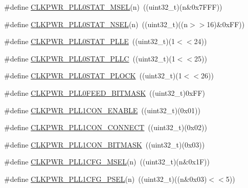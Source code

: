 \begin{DoxyCompactItemize}
\item 
\#define \hyperlink{group___c_l_k_p_w_r___private___macros_ga4e839399ffd20043dd46b1c0f37642fe}{\-C\-L\-K\-P\-W\-R\-\_\-\-P\-L\-L0\-S\-T\-A\-T\-\_\-\-M\-S\-E\-L}(n)~((uint32\-\_\-t)(n\&0x7\-F\-F\-F))
\item 
\#define \hyperlink{group___c_l_k_p_w_r___private___macros_ga33ba93a4bdf0992f4e942462f33abc3e}{\-C\-L\-K\-P\-W\-R\-\_\-\-P\-L\-L0\-S\-T\-A\-T\-\_\-\-N\-S\-E\-L}(n)~((uint32\-\_\-t)((n$>$$>$16)\&0x\-F\-F))
\item 
\#define \hyperlink{group___c_l_k_p_w_r___private___macros_gaa2ebc7980134442f9f9bc392e98ad463}{\-C\-L\-K\-P\-W\-R\-\_\-\-P\-L\-L0\-S\-T\-A\-T\-\_\-\-P\-L\-L\-E}~((uint32\-\_\-t)(1$<$$<$24))
\item 
\#define \hyperlink{group___c_l_k_p_w_r___private___macros_ga415ec12d691507191debd03e09ecb81d}{\-C\-L\-K\-P\-W\-R\-\_\-\-P\-L\-L0\-S\-T\-A\-T\-\_\-\-P\-L\-L\-C}~((uint32\-\_\-t)(1$<$$<$25))
\item 
\#define \hyperlink{group___c_l_k_p_w_r___private___macros_ga5c67d9377481a9eb5da712a93aa4cb70}{\-C\-L\-K\-P\-W\-R\-\_\-\-P\-L\-L0\-S\-T\-A\-T\-\_\-\-P\-L\-O\-C\-K}~((uint32\-\_\-t)(1$<$$<$26))
\item 
\#define \hyperlink{group___c_l_k_p_w_r___private___macros_gae775dff1e028d9342f0798e4ffc3c490}{\-C\-L\-K\-P\-W\-R\-\_\-\-P\-L\-L0\-F\-E\-E\-D\-\_\-\-B\-I\-T\-M\-A\-S\-K}~((uint32\-\_\-t)0x\-F\-F)
\item 
\#define \hyperlink{group___c_l_k_p_w_r___private___macros_ga887a9ce77348290efc9e3a7e97b1d2d5}{\-C\-L\-K\-P\-W\-R\-\_\-\-P\-L\-L1\-C\-O\-N\-\_\-\-E\-N\-A\-B\-L\-E}~((uint32\-\_\-t)(0x01))
\item 
\#define \hyperlink{group___c_l_k_p_w_r___private___macros_ga37e9702988d0c7d33058372f9e679a73}{\-C\-L\-K\-P\-W\-R\-\_\-\-P\-L\-L1\-C\-O\-N\-\_\-\-C\-O\-N\-N\-E\-C\-T}~((uint32\-\_\-t)(0x02))
\item 
\#define \hyperlink{group___c_l_k_p_w_r___private___macros_gae940d56cd95d9094750064ae5a8c9150}{\-C\-L\-K\-P\-W\-R\-\_\-\-P\-L\-L1\-C\-O\-N\-\_\-\-B\-I\-T\-M\-A\-S\-K}~((uint32\-\_\-t)(0x03))
\item 
\#define \hyperlink{group___c_l_k_p_w_r___private___macros_ga6e139f032f79b7e1bed38975c976bd7d}{\-C\-L\-K\-P\-W\-R\-\_\-\-P\-L\-L1\-C\-F\-G\-\_\-\-M\-S\-E\-L}(n)~((uint32\-\_\-t)(n\&0x1\-F))
\item 
\#define \hyperlink{group___c_l_k_p_w_r___private___macros_ga46ff76d399ebcd900f839ce8a9e72ad5}{\-C\-L\-K\-P\-W\-R\-\_\-\-P\-L\-L1\-C\-F\-G\-\_\-\-P\-S\-E\-L}(n)~((uint32\-\_\-t)((n\&0x03)$<$$<$5))
$$
\end{DoxyCompactItemize}
